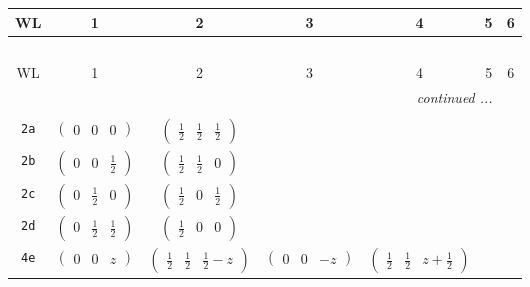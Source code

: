 \documentclass[fleqn,9pt,landscape]{jsarticle}
\begin{document}
\begin{center}
\renewcommand{\arraystretch}{1.2}
\begin{longtable}{ccccccc}
 \hline \hline
WL & 1 & 2 & 3 & 4 & 5 & 6 \\ \hline \endfirsthead

\multicolumn{6}{l}{\tablename\ \thetable{}} \\
 \hline \hline
WL & 1 & 2 & 3 & 4 & 5 & 6 \\ \hline \endhead

 \hline \hline
\multicolumn{6}{r}{\footnotesize\it continued ...} \\ \endfoot

 \hline \hline
\multicolumn{6}{r}{} \\ \endlastfoot

{\tt 2a} & $ \begin{pmatrix} 0 & 0 & 0 \end{pmatrix} $ & $ \begin{pmatrix} \frac{1}{2} & \frac{1}{2} & \frac{1}{2} \end{pmatrix} $ & $  $ & $  $ & $  $ & $  $ \\ \hline
{\tt 2b} & $ \begin{pmatrix} 0 & 0 & \frac{1}{2} \end{pmatrix} $ & $ \begin{pmatrix} \frac{1}{2} & \frac{1}{2} & 0 \end{pmatrix} $ & $  $ & $  $ & $  $ & $  $ \\ \hline
{\tt 2c} & $ \begin{pmatrix} 0 & \frac{1}{2} & 0 \end{pmatrix} $ & $ \begin{pmatrix} \frac{1}{2} & 0 & \frac{1}{2} \end{pmatrix} $ & $  $ & $  $ & $  $ & $  $ \\ \hline
{\tt 2d} & $ \begin{pmatrix} 0 & \frac{1}{2} & \frac{1}{2} \end{pmatrix} $ & $ \begin{pmatrix} \frac{1}{2} & 0 & 0 \end{pmatrix} $ & $  $ & $  $ & $  $ & $  $ \\ \hline
{\tt 4e} & $ \begin{pmatrix} 0 & 0 & z \end{pmatrix} $ & $ \begin{pmatrix} \frac{1}{2} & \frac{1}{2} & \frac{1}{2} - z \end{pmatrix} $ & $ \begin{pmatrix} 0 & 0 & - z \end{pmatrix} $ & $ \begin{pmatrix} \frac{1}{2} & \frac{1}{2} & z + \frac{1}{2} \end{pmatrix} $ & $  $ & $  $ \\ \hline

\end{longtable}
\end{center}
\end{document}
